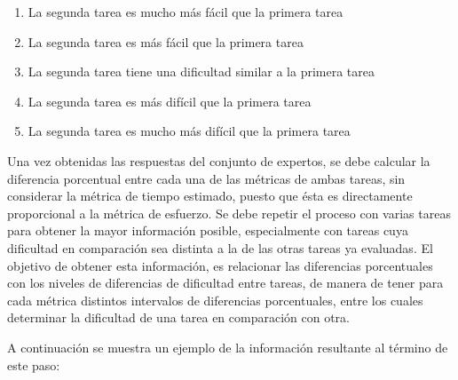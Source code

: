 \documentclass[letterpaper,12pt]{article}
\begin{document}
\begin{enumerate}
  \item La segunda tarea es mucho más fácil que la primera tarea
  \item La segunda tarea es más fácil que la primera tarea
  \item La segunda tarea tiene una dificultad similar a la primera tarea
  \item La segunda tarea es más difícil que la primera tarea
  \item La segunda tarea es mucho más difícil que la primera tarea
\end{enumerate}

Una vez obtenidas las respuestas del conjunto de expertos, se debe calcular la diferencia porcentual entre cada una de las métricas de ambas tareas, sin considerar la métrica de tiempo estimado, puesto que ésta es directamente proporcional a la métrica de esfuerzo. Se debe repetir el proceso con varias tareas para obtener la mayor información posible, especialmente con tareas cuya dificultad en comparación sea distinta a la de las otras tareas ya evaluadas. El objetivo de obtener esta información, es relacionar las diferencias porcentuales con los niveles de diferencias de dificultad entre tareas, de manera de tener para cada métrica distintos intervalos de diferencias porcentuales, entre los cuales determinar la dificultad de una tarea en comparación con otra.

A continuación se muestra un ejemplo de la información resultante al término de este paso:
\end{document}
